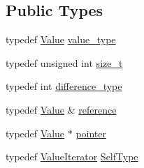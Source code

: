 \subsection*{Public Types}
\begin{DoxyCompactItemize}
\item 
typedef \hyperlink{class_json_1_1_value}{Value} \hyperlink{class_json_1_1_value_iterator_a2c5ba7be611f05546530c8a88b2d2e37}{value\+\_\+type}
\item 
typedef unsigned int \hyperlink{class_json_1_1_value_iterator_a308b8932ffc83eaa9d12dadd5c11a7dd}{size\+\_\+t}
\item 
typedef int \hyperlink{class_json_1_1_value_iterator_a2be1a9aa60bbfc8812e9dd1a7f1a8786}{difference\+\_\+type}
\item 
typedef \hyperlink{class_json_1_1_value}{Value} \& \hyperlink{class_json_1_1_value_iterator_ae87929b4567aa00372cf602c43b57160}{reference}
\item 
typedef \hyperlink{class_json_1_1_value}{Value} $\ast$ \hyperlink{class_json_1_1_value_iterator_acec45feb1ef1f3bf81240157d06d5432}{pointer}
\item 
typedef \hyperlink{class_json_1_1_value_iterator}{Value\+Iterator} \hyperlink{class_json_1_1_value_iterator_a23357670fdad61792670d86f62db7e16}{Self\+Type}
\end{DoxyCompactItemize}
